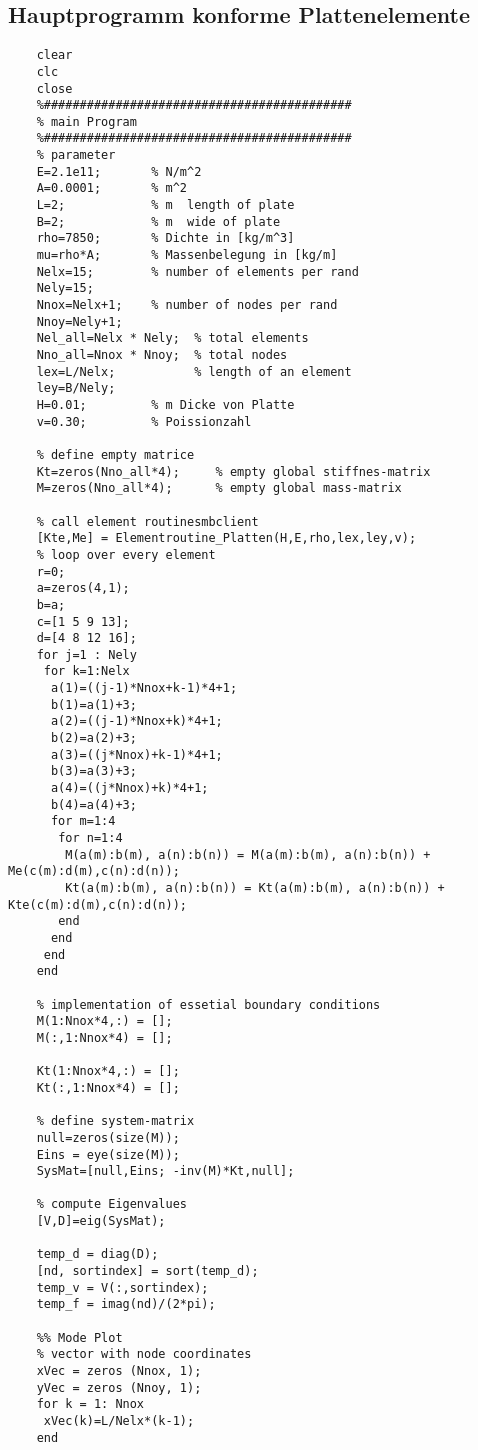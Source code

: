 	\subsection*{Hauptprogramm konforme Plattenelemente}
	\begin{lstlisting}
	clear
	clc
	close
	%###########################################
	% main Program
	%###########################################
	% parameter
	E=2.1e11;       % N/m^2
	A=0.0001;       % m^2
	L=2;            % m  length of plate
	B=2;            % m  wide of plate
	rho=7850;       % Dichte in [kg/m^3]
	mu=rho*A;       % Massenbelegung in [kg/m]
	Nelx=15;        % number of elements per rand
	Nely=15;
	Nnox=Nelx+1;    % number of nodes per rand
	Nnoy=Nely+1;
	Nel_all=Nelx * Nely;  % total elements
	Nno_all=Nnox * Nnoy;  % total nodes
	lex=L/Nelx;           % length of an element
	ley=B/Nely;
	H=0.01;         % m Dicke von Platte
	v=0.30;         % Poissionzahl
	
	% define empty matrice
	Kt=zeros(Nno_all*4);     % empty global stiffnes-matrix 
	M=zeros(Nno_all*4);      % empty global mass-matrix 
	
	% call element routinesmbclient
	[Kte,Me] = Elementroutine_Platten(H,E,rho,lex,ley,v);
	% loop over every element
	r=0;
	a=zeros(4,1);
	b=a;
	c=[1 5 9 13];
	d=[4 8 12 16];
	for j=1 : Nely                                  
	 for k=1:Nelx
	  a(1)=((j-1)*Nnox+k-1)*4+1;
	  b(1)=a(1)+3;
	  a(2)=((j-1)*Nnox+k)*4+1;
	  b(2)=a(2)+3;
	  a(3)=((j*Nnox)+k-1)*4+1;
	  b(3)=a(3)+3;
	  a(4)=((j*Nnox)+k)*4+1;
	  b(4)=a(4)+3;
	  for m=1:4
	   for n=1:4
	    M(a(m):b(m), a(n):b(n)) = M(a(m):b(m), a(n):b(n)) + Me(c(m):d(m),c(n):d(n));
	    Kt(a(m):b(m), a(n):b(n)) = Kt(a(m):b(m), a(n):b(n)) + Kte(c(m):d(m),c(n):d(n));
	   end
	  end
	 end
	end
	
	% implementation of essetial boundary conditions
	M(1:Nnox*4,:) = [];
	M(:,1:Nnox*4) = [];
	
	Kt(1:Nnox*4,:) = [];
	Kt(:,1:Nnox*4) = [];
	
	% define system-matrix
	null=zeros(size(M));
	Eins = eye(size(M));
	SysMat=[null,Eins; -inv(M)*Kt,null];
	
	% compute Eigenvalues
	[V,D]=eig(SysMat);
	
	temp_d = diag(D);
	[nd, sortindex] = sort(temp_d);
	temp_v = V(:,sortindex);
	temp_f = imag(nd)/(2*pi);
	
	%% Mode Plot
	% vector with node coordinates
	xVec = zeros (Nnox, 1);     
	yVec = zeros (Nnoy, 1); 
	for k = 1: Nnox
	 xVec(k)=L/Nelx*(k-1);    
	end
	

\end{lstlisting}

